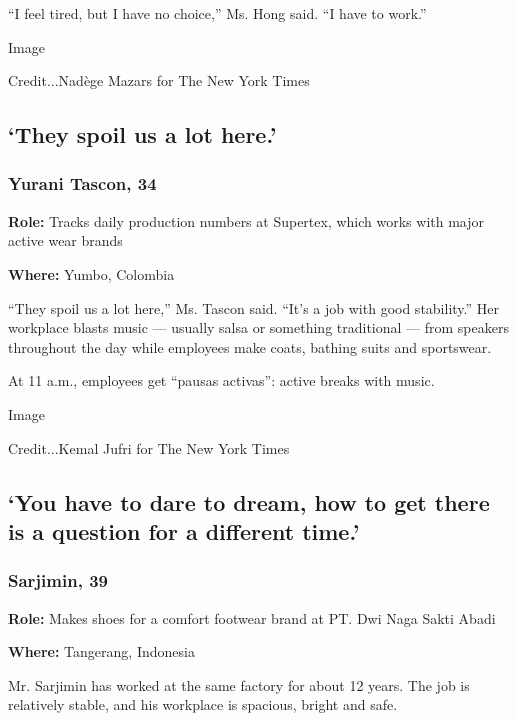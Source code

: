 ``I feel tired, but I have no choice,'' Ms. Hong said. ``I have to
work.''

Image

Credit...Nadège Mazars for The New York Times

\hypertarget{they-spoil-us-a-lot-here}{%
\subsection{`They spoil us a lot
here.'}\label{they-spoil-us-a-lot-here}}

\hypertarget{yurani-tascon-34}{%
\subsubsection{Yurani Tascon, 34}\label{yurani-tascon-34}}

\textbf{Role:} Tracks daily production numbers at Supertex, which works
with major active wear brands

\textbf{Where:} Yumbo, Colombia

``They spoil us a lot here,'' Ms. Tascon said. ``It's a job with good
stability.'' Her workplace blasts music --- usually salsa or something
traditional --- from speakers throughout the day while employees make
coats, bathing suits and sportswear.

At 11 a.m., employees get ``pausas activas'': active breaks with music.

Image

Credit...Kemal Jufri for The New York Times

\hypertarget{you-have-to-dare-to-dream-how-to-get-there-is-a-question-for-a-different-time}{%
\subsection{`You have to dare to dream, how to get there is a question
for a different
time.'}\label{you-have-to-dare-to-dream-how-to-get-there-is-a-question-for-a-different-time}}

\hypertarget{sarjimin-39}{%
\subsubsection{Sarjimin, 39}\label{sarjimin-39}}

\textbf{Role:} Makes shoes for a comfort footwear brand at PT. Dwi Naga
Sakti Abadi

\textbf{Where:} Tangerang, Indonesia

Mr. Sarjimin has worked at the same factory for about 12 years. The job
is relatively stable, and his workplace is spacious, bright and safe.

